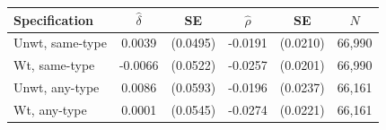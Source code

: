\begin{tabular}{lccccc}
\toprule
Specification & $\hat{\delta}$ & SE & $\hat{\rho}$ & SE & $N$ \\
\midrule
Unwt, same-type & 0.0039 & (0.0495) & -0.0191 & (0.0210) & 66,990 \\
Wt, same-type & -0.0066 & (0.0522) & -0.0257 & (0.0201) & 66,990 \\
Unwt, any-type & 0.0086 & (0.0593) & -0.0196 & (0.0237) & 66,161 \\
Wt, any-type & 0.0001 & (0.0545) & -0.0274 & (0.0221) & 66,161 \\
\bottomrule
\end{tabular}
